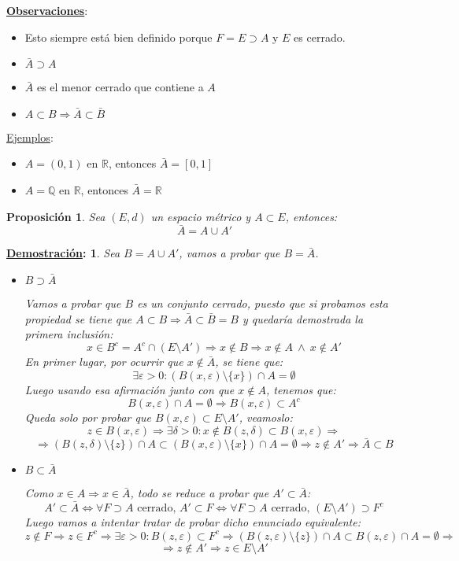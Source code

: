 \documentclass[10pt,a4paper,openright]{book}
\theoremstyle{break}
\newtheorem*{prop}{Proposición}
\newtheorem*{demo}{\underline{Demostración}:}
\begin{document}
\newpage

\underline{\textbf{Observaciones}}:
\begin{itemize}
\item Esto siempre está bien definido porque $F=E\supset A$ y $E$ es cerrado.
\item $\bar{A}\supset A$
\item $\bar{A}$ es el menor cerrado que contiene a $A$
\item $A\subset B\Rightarrow \bar{A}\subset \bar{B}$
\end{itemize}

\underline{Ejemplos}:
\begin{itemize}
\item $A = (0,1)$ en $\mathbb{R}$, entonces $\bar{A} = [0,1]$
\item $A = \mathbb{Q}$ en $\mathbb{R}$, entonces $\bar{A} = \mathbb{R}$
\end{itemize}

\begin{prop}
Sea $(E,d)$ un espacio métrico y $A\subset E$, entonces:
$$\bar{A} = A \cup A'$$
\end{prop}

\begin{demo}
Sea $B= A\cup A'$, vamos a probar que $B=\bar{A}$.
\begin{itemize}
\item $B \supset \bar{A}$

Vamos a probar que $B$ es un conjunto cerrado, puesto que si probamos esta propiedad se tiene que $A\subset B\Rightarrow \bar{A}\subset \bar{B} = B$ y quedaría demostrada la primera inclusión:
$$x \in B^{c} = A^{c} \cap (E\setminus A')\Rightarrow x\notin B \Rightarrow x\notin A \ \wedge \ x\notin A'$$
En primer lugar, por ocurrir que $x\notin \bar{A}$, se tiene que:
$$\exists \varepsilon > 0 : \left( B(x,\varepsilon)\setminus\{x\}\right)\cap A = \emptyset$$
Luego usando esa afirmación junto con que $x\notin A$, tenemos que:
$$B(x,\varepsilon)\cap A = \emptyset\Rightarrow B(x,\varepsilon) \subset A^{c}$$
Queda solo por probar que $B(x,\varepsilon)\subset E\setminus A'$, veamoslo:
$$z\in B(x,\varepsilon)\Rightarrow \exists \delta > 0 : x\notin B(z, \delta)\subset B(x,\varepsilon) \Rightarrow$$
$$\Rightarrow \left(B(z,\delta)\setminus \{z\}\right)\cap A \subset \left(B(x,\varepsilon)\setminus\{x\}\right)\cap A = \emptyset\Rightarrow z \notin A' \Rightarrow \bar{A}\subset B$$

\item $B\subset \bar{A}$

Como $x\in A\Rightarrow x \in \bar{A}$, todo se reduce a probar que $A'\subset \bar{A}$:
$$A'\subset \bar{A} \Leftrightarrow \forall F\supset A \mbox{ cerrado, } A'\subset F \Leftrightarrow \forall F \supset A \mbox{ cerrado, }(E\setminus A')\supset F^{c}$$
Luego vamos a intentar tratar de probar dicho enunciado equivalente:
$$z\notin F \Rightarrow z \in F^{c} \Rightarrow \exists \varepsilon > 0 : B(z,\varepsilon)\subset F^{c}\Rightarrow \left(B(z,\varepsilon)\setminus\{z\}\right)\cap A \subset B(z,\varepsilon)\cap A = \emptyset \Rightarrow$$
$$\Rightarrow z \notin A' \Rightarrow z \in E\setminus A'$$
\end{itemize}
\end{demo}
\end{document}
